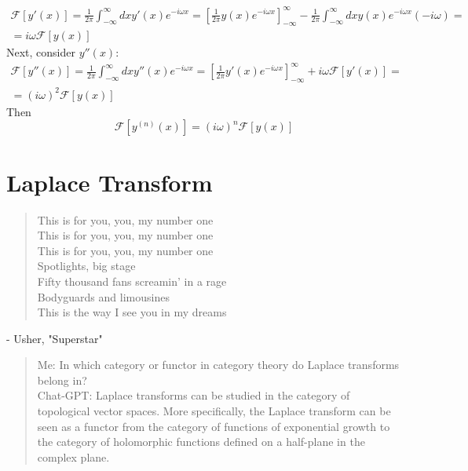 \documentclass[10pt]{amsart}
\begin{document}
\begin{multicols*}{2}
\[
\begin{gathered}
\mathcal{F}[y'(x)] = \frac{1}{2\pi} \int_{-\infty}^{\infty} dx y'(x) e^{-i\omega x } = \left[ \frac{1}{2\pi} y(x) e^{-i\omega x} \right]_{-\infty}^{\infty} - \frac{1}{2\pi} \int_{-\infty}^{\infty} dx y(x) e^{-i\omega x} (-i \omega) = \\
= i\omega \mathcal{F}[y(x)]
\end{gathered}
\]
Next, consider $y''(x)$:
\[
\begin{gathered}
\mathcal{F}[y''(x)] = \frac{1}{2\pi} \int_{-\infty}^{\infty} dx y''(x) e^{-i\omega x } = \left[ \frac{1}{2\pi} y'(x) e^{-i\omega x} \right]_{-\infty}^{\infty} + i \omega \mathcal{F}[y'(x)] = \\
= (i\omega)^2 \mathcal{F}[y(x)]
\end{gathered}
\]
Then 
\begin{equation}
\mathcal{F}[y^{(n)}(x) ] = (i\omega)^n \mathcal{F}[y(x)]
\end{equation}

\part{Laplace Transform}

\begin{quotation}
This is for you, you, my number one \\
This is for you, you, my number one \\

This is for you, you, my number one \\

Spotlights, big stage \\
Fifty thousand fans screamin' in a rage \\
Bodyguards and limousines \\
This is the way I see you in my dreams \\
\end{quotation}
- Usher, "Superstar" \\

\begin{quotation}
Me: In which category or functor in category theory do Laplace transforms belong in? \\

Chat-GPT: Laplace transforms can be studied in the category of topological vector spaces. More specifically, the Laplace transform can be seen as a functor from the category of functions of exponential growth to the category of holomorphic functions defined on a half-plane in the complex plane. \\


\end{quotation}
\end{multicols*}
\end{document}
